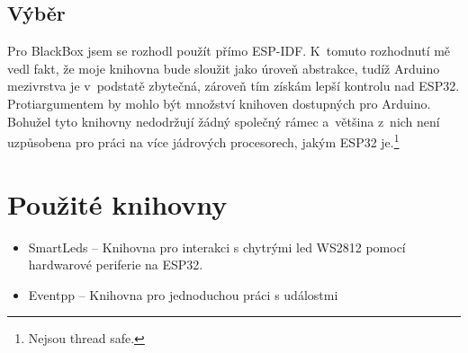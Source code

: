 \subsection{Výběr}

Pro BlackBox jsem se rozhodl použít přímo ESP-IDF.
K~tomuto rozhodnutí mě vedl fakt, že moje knihovna bude sloužit jako úroveň abstrakce, tudíž Arduino mezivrstva je v~podstatě zbytečná, zároveň tím získám lepší kontrolu nad ESP32.
Protiargumentem by mohlo být množství knihoven dostupných pro Arduino.
Bohužel tyto knihovny nedodržují žádný společný rámec a~většina z~nich není uzpůsobena pro práci na více jádrových procesorech, jakým ESP32 je.\footnote{Nejsou thread safe.}

\section{Použité knihovny}

\begin{itemize}
    \item SmartLeds --
        Knihovna pro interakci s chytrými led WS2812 pomocí hardwarové periferie na ESP32. %
    \item Eventpp --
        Knihovna pro jednoduchou práci s událostmi
\end{itemize}